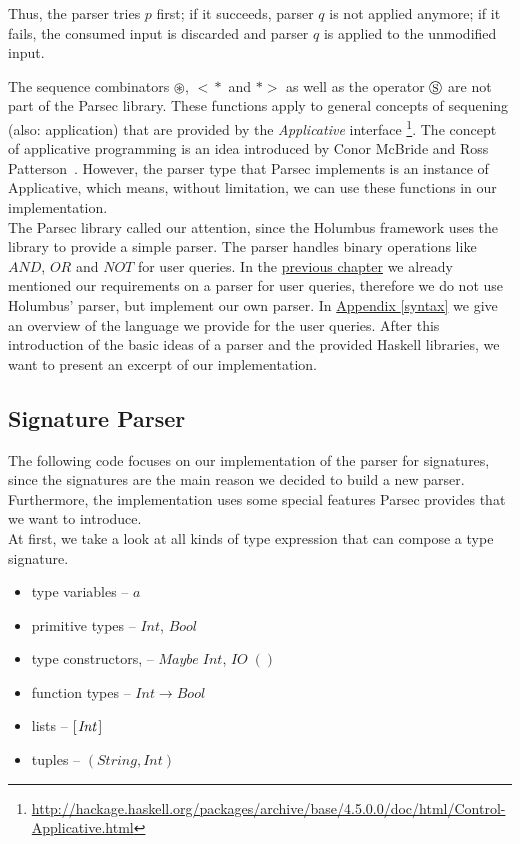 \documentclass[%
	latex,%
	a4paper,%
	oneside,%
	chapterprefix,%
	headsepline,%
	12pt%
]{scrbook}
\newcommand{\Conid}[1]{\mathit{#1}}
\newcommand{\Varid}[1]{\mathit{#1}}
\begin{document}
Thus, the parser tries \ensuremath{\Varid{p}} first; if it succeeds, parser \ensuremath{\Varid{q}} is not
applied anymore; if it fails, the consumed input is discarded and
parser \ensuremath{\Varid{q}} is applied to the unmodified input. %

The sequence combinators \ensuremath{\circledast}, \ensuremath{<\!\!\!*} and \ensuremath{*\!\!\!>} as well as the operator
\ensuremath{\circledS} are not part of the Parsec library. %
These functions apply to general concepts of sequening (also:
application) that are provided by the \emph{Applicative} interface
\footnote{\url{http://hackage.haskell.org/packages/archive/base/4.5.0.0/doc/html/Control-Applicative.html}}. %
The concept of applicative programming is an idea introduced by Conor
McBride and Ross Patterson~\cite{applicative}. %
However, the parser type that Parsec implements is an instance of
Applicative, which means, without limitation, we can use these functions in our
implementation. \\ %

The Parsec library called our attention, since the Holumbus framework
uses the library to provide a simple parser. %
The parser handles binary operations like \ensuremath{\Conid{AND}}, \ensuremath{\Conid{OR}} and \ensuremath{\Conid{NOT}} for
user queries. %
In the \hyperref[analysis:parser]{previous chapter} we already
mentioned our requirements on a parser for user queries, therefore we
do not use Holumbus' parser, but implement our own parser. %
In \hyperref[syntax]{Appendix \ref{syntax}} we give an overview of
the language we provide for the user queries. %
After this introduction of the basic ideas of a parser and the provided
Haskell libraries, we want to present an excerpt of our
implementation. \\ %

\subsection{Signature Parser}

The following code focuses on our implementation of the
parser for signatures, since the signatures are the main reason we
decided to build a new parser. %
Furthermore, the implementation uses some special features Parsec
provides that we want to introduce. \\ %

At first, we take a look at all kinds of type expression that can
compose a type signature. %

\begin{itemize}
\item type variables -- \ensuremath{\Varid{a}}
\item primitive types -- \ensuremath{\Conid{Int}}, \ensuremath{\Conid{Bool}}
\item type constructors, -- \ensuremath{\Conid{Maybe}\;\Conid{Int}}, \ensuremath{\Conid{IO}\;()}
\item function types -- \ensuremath{\Conid{Int}\to \Conid{Bool}}
\item lists -- \ensuremath{[\mskip1.5mu \Conid{Int}\mskip1.5mu]}
\item tuples -- \ensuremath{(\Conid{String},\Conid{Int})}
\end{itemize}
\end{document}
